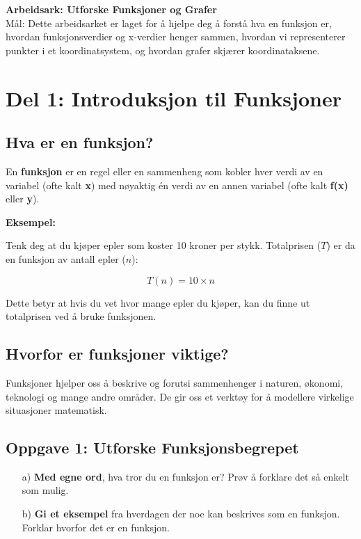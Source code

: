 \documentclass[12pt]{article}
\begin{document}
\begin{center}
    {\LARGE \textbf{Arbeidsark: Utforske Funksjoner og Grafer}}\\[0.5cm]
    {\large Mål: Dette arbeidsarket er laget for å hjelpe deg å forstå hva en funksjon er, hvordan funksjonsverdier og x-verdier henger sammen, hvordan vi representerer punkter i et koordinatsystem, og hvordan grafer skjærer koordinataksene.}
\end{center}

\section*{Del 1: Introduksjon til Funksjoner}

\subsection*{Hva er en funksjon?}

En \textbf{funksjon} er en regel eller en sammenheng som kobler hver verdi av en variabel (ofte kalt \textbf{x}) med nøyaktig én verdi av en annen variabel (ofte kalt \textbf{f(x)} eller \textbf{y}).

\textbf{Eksempel:}

Tenk deg at du kjøper epler som koster 10 kroner per stykk. Totalprisen (\(T\)) er da en funksjon av antall epler (\(n\)):

\[
T(n) = 10 \times n
\]

Dette betyr at hvis du vet hvor mange epler du kjøper, kan du finne ut totalprisen ved å bruke funksjonen.

\subsection*{Hvorfor er funksjoner viktige?}

Funksjoner hjelper oss å beskrive og forutsi sammenhenger i naturen, økonomi, teknologi og mange andre områder. De gir oss et verktøy for å modellere virkelige situasjoner matematisk.

\subsection*{Oppgave 1: Utforske Funksjonsbegrepet}

\begin{enumerate}
    \item[a)] \textbf{Med egne ord}, hva tror du en funksjon er? Prøv å forklare det så enkelt som mulig.
    \item[b)] \textbf{Gi et eksempel} fra hverdagen der noe kan beskrives som en funksjon. Forklar hvorfor det er en funksjon.
\end{enumerate}
\end{document}
